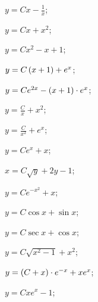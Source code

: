 	\label{sol:firstorder:linear}
	\begin{enumsols}

		\item \( y = Cx - \frac{1}{x} \); \sfill %
		\item \( y = Cx + x^2 \); \sfill %
		\item \( y = Cx^2 - x + 1 \); \sfill %
		\item \( y = C \left( x + 1 \right) + e^{x} \); \sfill %
		\item \( y = C e^{2x} - \left( x + 1 \right) \cdot e^{x} \); \sfill %
		\item \( y = \frac{C}{x} + x^2 \); \sfill %
		\item \( y = \frac{C}{x^2} + e^{x} \); \sfill %
		\item \( y = C e^{x} + x \); \sfill %
		\item \( x = C \sqrt{y} + 2y - 1 \); \sfill %
		\item \( y = Ce^{-x^2} + x \); \sfill %
		\item \( y = C\cos{x} + \sin{x} \); \sfill %
		\item \( y = C \sec{x} + \cos{x} \); \sfill %
		\item \( y = C \sqrt{x^2 - 1} + x^2 \); \sfill %
		\item \( y = \left( C + x \right) \cdot e^{-x} + xe^{x} \); \sfill %
		\item \( y = Cxe^{x} - 1 \); \sfill %


\end{enumsols}
